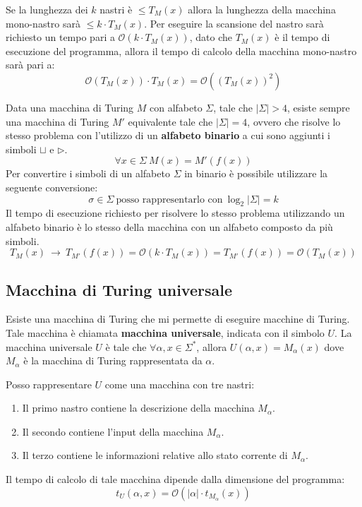 \begin{dimostrazione}
    Se la lunghezza dei $k$ nastri è $\leq T_M(x)$ allora la lunghezza della
    macchina mono-nastro sarà $\leq k \cdot T_M(x)$. Per eseguire la scansione
    del nastro sarà richiesto un tempo pari a $\mathcal{O}(k \cdot T_M(x))$,
    dato che $T_M(x)$ è il tempo di esecuzione del programma, allora il tempo di
    calcolo della macchina mono-nastro sarà pari a:
    \begin{equation}
        \mathcal{O}(T_M(x)) \cdot T_M(x) = \mathcal{O}((T_M(x))^2)
    \end{equation}
\end{dimostrazione}
Data una macchina di Turing $M$ con alfabeto $\Sigma$, tale che $|\Sigma| > 4$,
esiste sempre una macchina di Turing $M'$ equivalente tale che $|\Sigma| = 4$,
ovvero che risolve lo stesso problema con l'utilizzo di un \textbf{alfabeto
    binario} a cui sono aggiunti i simboli $\sqcup$ e $\triangleright$.
\begin{equation}
    \forall x \in \Sigma \ M(x) = M'(f(x))
\end{equation}
Per convertire i simboli di un alfabeto $\Sigma$ in binario è possibile utilizzare
la seguente conversione:
\begin{equation}
    \sigma \in \Sigma \ \text{posso rappresentarlo con} \ \log_{2}|\Sigma | = k
\end{equation}
Il tempo di esecuzione richiesto per risolvere lo stesso problema utilizzando un
alfabeto binario è lo stesso della macchina con un alfabeto composto da più simboli.
\begin{equation}
    T_M(x) \ \to \ T_{M'}(f(x)) = \mathcal{O}(k \cdot T_M(x)) = T_{M'}(f(x)) =
    \mathcal{O}(T_M(x))
\end{equation}
\subsection{Macchina di Turing universale}
Esiste una macchina di Turing che mi permette di eseguire macchine di Turing.
Tale macchina è chiamata \textbf{macchina universale}, indicata con il simbolo
$U$. La macchina universale $U$ è tale che $\forall \alpha, x \in \Sigma^{\ast}$,
allora $U(\alpha, x) = M_{\alpha}(x)$ dove $M_{\alpha}$ è la macchina di Turing
rappresentata da $\alpha$.

Posso rappresentare $U$ come una macchina con tre nastri:
\begin{enumerate}
    \item Il primo nastro contiene la descrizione della macchina $M_{\alpha}$.
    \item Il secondo contiene l'input della macchina $M_{\alpha}$.
    \item Il terzo contiene le informazioni relative allo stato corrente di $M_{\alpha}$.
\end{enumerate}
Il tempo di calcolo di tale macchina dipende dalla dimensione del programma:
\begin{equation}
    t_U(\alpha, x) = \mathcal{O}(|\alpha| \cdot t_{M_{\alpha}}(x))
\end{equation}

